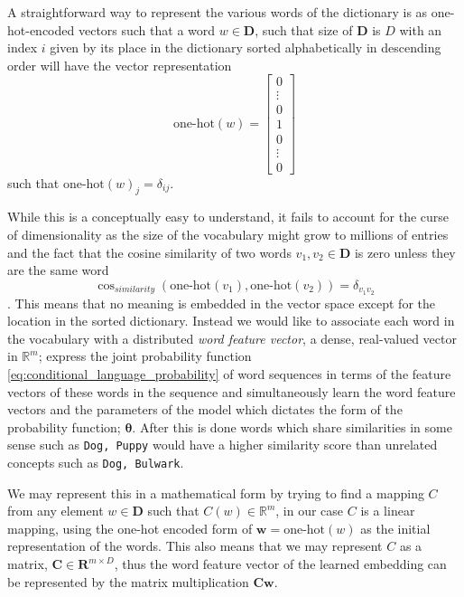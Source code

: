 A straightforward way to represent the various words of the dictionary is as
one-hot-encoded vectors such that a word $w \in \mathbf{D}$, such that size of
$\mathbf{D}$ is $D$ with an index $i$
given by its place in the dictionary sorted alphabetically in descending order
will have the vector representation
\begin{equation}
  \label{eq:one_hot_encoding}
  \text{one-hot}(w) =
  \begin{bmatrix}
    0 \\
    \vdots \\
    0 \\
    1 \\
    0 \\
    \vdots \\
    0
  \end{bmatrix}
\end{equation}\cite[p.~6]{goldberg2015primer}
such that $\text{one-hot}(w)_{j} = \delta_{ij}$.

While this is a conceptually easy to understand, it fails to account for the
curse of dimensionality as the size of the vocabulary might grow to millions of
entries and the fact that the cosine similarity of two words $v_1, v_2 \in
\mathbf{D}$ is zero unless they are the same word
\begin{equation}
  \label{eq:cosine_similarity}
  \cos_{similarity}(\text{one-hot}(v_1), \text{one-hot}(v_2)) = \delta_{v_1 v_2}
\end{equation}. This means that no meaning is embedded in the vector space
except for the location in the sorted dictionary. Instead we would like to
associate each word in the vocabulary with a distributed \textit{word feature
  vector}, a dense, real-valued vector in $\mathbb{R}^m$; express the joint probability
function \ref{eq:conditional_language_probability} of word sequences in terms of
the feature vectors of these words in the sequence and simultaneously learn the
word feature vectors and the parameters of the model which dictates the form of
the probability function; $\bm{\theta}$. After this is done words which share
similarities in some sense such as \texttt{Dog, Puppy} would have a higher
similarity score than unrelated concepts such as \texttt{Dog, Bulwark}\cite{Bengio:2003:NPL:944919.944966}.

We may represent this in a mathematical form by trying to find a mapping $C$
from any element $w \in \mathbf{D}$ such that $C(w) \in \mathbb{R}^m$, in our
case $C$ is a linear mapping, using the one-hot encoded form of $\bm{w} =
\text{one-hot}(w)$ as the
initial representation of the words. This also means that we may represent $C$
as a matrix, $\bm{C} \in \mathbf{R}^{m \times D}$, thus the word feature vector of
the learned embedding can be represented by the matrix multiplication
$\bm{C}\bm{w}$.

